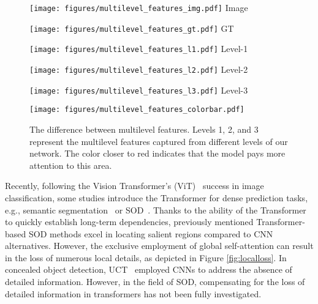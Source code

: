 \documentclass[lettersize,journal]{IEEEtran}
\begin{document}
\begin{figure}[t]
	\centering
	\begin{minipage}[t]{0.085\textwidth}
		\centering
		\texttt{[image: figures/multilevel\_features\_img.pdf]}
		\centering\footnotesize{Image}
	\end{minipage}
	\begin{minipage}[t]{0.085\textwidth}
		\centering
		\texttt{[image: figures/multilevel\_features\_gt.pdf]}
		\centering\footnotesize{GT}
	\end{minipage}
	\begin{minipage}[t]{0.085\textwidth}
		\centering
		\texttt{[image: figures/multilevel\_features\_l1.pdf]}
		\centering\footnotesize{Level-1}
	\end{minipage}
	\begin{minipage}[t]{0.085\textwidth}
		\centering
		\texttt{[image: figures/multilevel\_features\_l2.pdf]}
		\centering\footnotesize{Level-2}
	\end{minipage}
	\begin{minipage}[t]{0.085\textwidth}
		\centering
		\texttt{[image: figures/multilevel\_features\_l3.pdf]}
		\centering\footnotesize{Level-3}
	\end{minipage}
	\begin{minipage}[t]{0.03\textwidth}
		\centering
		\texttt{[image: figures/multilevel\_features\_colorbar.pdf]}
	\end{minipage}
	\par\;\caption{The difference between multilevel features. Levels 1, 2, and 3 represent the multilevel features captured from different levels of our network. The color closer to red indicates that the model pays more attention to this area. }
	\label{fig:multilevelfeatures}
\end{figure}

Recently, following the Vision Transformer’s (ViT)~\cite{Vit} success in image classification, some studies introduce the Transformer for dense prediction tasks, e.g., semantic segmentation~\cite{SETR, xie2021segformer, Zhang_2022_CVPR} or SOD~\cite{VST, SelfReformer, Tang2023RTransNet}. Thanks to the ability of the Transformer to quickly establish long-term dependencies, previously mentioned Transformer-based SOD methods excel in locating salient regions compared to CNN alternatives. However, the exclusive employment of global self-attention can result in the loss of numerous local details, as depicted in Figure \ref{fig:localloss}. In concealed object detection, UCT~\cite{10006834} employed CNNs to address the absence of detailed information. However, in the field of SOD, compensating for the loss of detailed information in transformers has not been fully investigated. 
\end{document}
